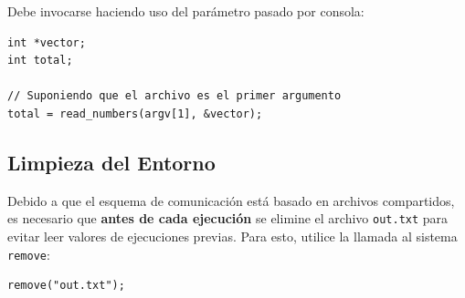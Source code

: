 \documentclass[12pt,a4paper]{article}
\begin{document}
Debe invocarse haciendo uso del parámetro pasado por consola:
\begin{lstlisting}
int *vector;
int total;

// Suponiendo que el archivo es el primer argumento
total = read_numbers(argv[1], &vector);
\end{lstlisting}

\subsection*{Limpieza del Entorno}
Debido a que el esquema de comunicación está basado en archivos compartidos, es necesario que \textbf{antes de cada ejecución} se elimine el archivo \texttt{out.txt} para evitar leer valores de ejecuciones previas. Para esto, utilice la llamada al sistema \texttt{remove}:
\begin{lstlisting}
remove("out.txt");
\end{lstlisting}
\end{document}
